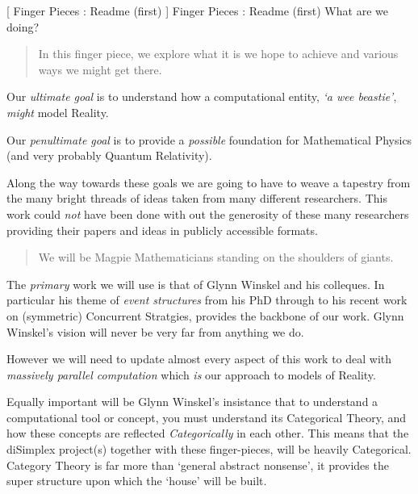 
[
  Finger Pieces : Readme (first)
]{
  Finger Pieces : Readme (first) What are we doing?
}
\author{Stephen Gaito}

\maketitle

\begin{abstract}
  In this finger piece, we explore what it is we hope to achieve and various
  ways we might get there.
\end{abstract}


Our \emph{ultimate goal} is to understand how a computational entity, \emph{`a
wee beastie'}, \emph{might} model Reality.

Our \emph{penultimate goal} is to provide a \emph{possible} foundation for
Mathematical Physics (and very probably Quantum Relativity).

Along the way towards these goals we are going to have to weave a tapestry from
the many bright threads of ideas taken from many different researchers. This
work could \emph{not} have been done with out the generosity of these many
researchers providing their papers and ideas in publicly accessible formats.

\begin{quote}
  We will be Magpie Mathematicians standing on the shoulders of
  giants.
\end{quote}

The \emph{primary} work we will use is that of Glynn Winskel and his colleques.
In particular his theme of \emph{event structures} from his PhD through to his
recent work on (symmetric) Concurrent Stratgies, provides the backbone of our
work. Glynn Winskel's vision will never be very far from anything we do.

However we will need to update almost every aspect of this work to deal with
\emph{massively parallel computation} which \emph{is} our approach to models of
Reality.

Equally important will be Glynn Winskel's insistance that to understand a
computational tool or concept, you must understand its Categorical Theory, and
how these concepts are reflected \emph{Categorically} in each other. This means
that the diSimplex project(s) together with these finger-pieces, will be heavily
Categorical. Category Theory is far more than `general abstract nonsense', it
provides the super structure upon which the `house' will be built.

